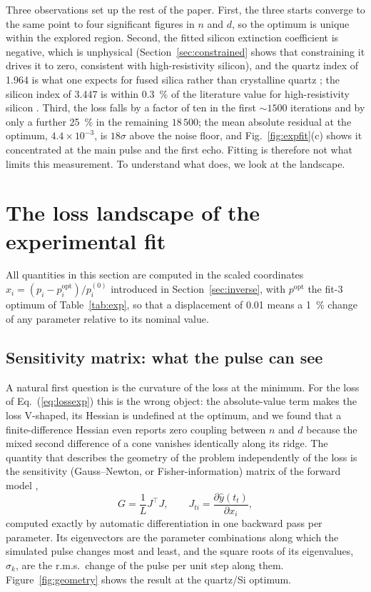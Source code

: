 \documentclass{optica-article}
\begin{document}
Three observations set up the rest of the paper. First, the three starts converge to the same point to four significant figures in $n$ and $d$, so the optimum is unique within the explored region. Second, the fitted silicon extinction coefficient is negative, which is unphysical (Section~\ref{sec:constrained} shows that constraining it drives it to zero, consistent with high-resistivity silicon), and the quartz index of 1.964 is what one expects for fused silica \cite{Grischkowsky1990,Naftaly2007} rather than crystalline quartz ; the silicon index of 3.447 is within \SI{0.3}{\percent} of the literature value for high-resistivity silicon \cite{Dai2004}. Third, the loss falls by a factor of ten in the first $\sim1500$ iterations and by only a further \SI{25}{\percent} in the remaining $18\,500$; the mean absolute residual at the optimum, $4.4\times10^{-3}$, is $18\sigma$ above the noise floor, and Fig.~\ref{fig:expfit}(c) shows it concentrated at the main pulse and the first echo. Fitting is therefore not what limits this measurement. To understand what does, we look at the landscape.

\section{The loss landscape of the experimental fit}\label{sec:landscape}
All quantities in this section are computed in the scaled coordinates $x_i=(p_i-p_i^{\mathrm{opt}})/p_i^{(0)}$ introduced in Section~\ref{sec:inverse}, with $p^{\mathrm{opt}}$ the fit-3 optimum of Table~\ref{tab:exp}, so that a displacement of 0.01 means a \SI{1}{\percent} change of any parameter relative to its nominal value.

\subsection{Sensitivity matrix: what the pulse can see}\label{sec:sens}
A natural first question is the curvature of the loss at the minimum. For the loss of Eq.~(\ref{eq:lossexp}) this is the wrong object: the absolute-value term makes the loss V-shaped, its Hessian is undefined at the optimum, and we found that a finite-difference Hessian even reports zero coupling between $n$ and $d$ because the mixed second difference of a cone vanishes identically along its ridge. The quantity that describes the geometry of the problem independently of the loss is the sensitivity (Gauss--Newton, or Fisher-information) matrix of the forward model \cite{Kay1993,Aster2018},
\begin{equation}
  G=\frac{1}{L}J^\top J,\qquad J_{ti}=\frac{\partial \hat y(t_t)}{\partial x_i},
  \label{eq:G}
\end{equation}
computed exactly by automatic differentiation in one backward pass per parameter. Its eigenvectors are the parameter combinations along which the simulated pulse changes most and least, and the square roots of its eigenvalues, $\sigma_k$, are the r.m.s.\ change of the pulse per unit step along them. Figure~\ref{fig:geometry} shows the result at the quartz/Si optimum.
\end{document}
